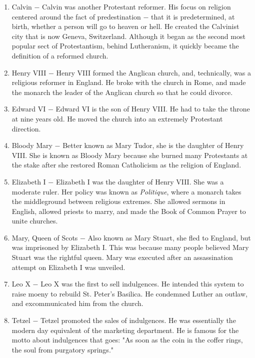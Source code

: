 \documentclass[12pt]{article}
\begin{document}
\begin{enumerate}
\item Calvin $-$ Calvin was another Protestant reformer. His focus on religion centered around the fact of predestination $-$ that it is predetermined, at birth, whether a person will go to heaven or hell. He created the Calvinist city that is now Geneva, Switzerland. Although it began as the second most popular sect of Protestantism, behind Lutheranism, it quickly became the definition of a reformed church.

\item Henry VIII $-$ Henry VIII formed the Anglican church, and, technically, was a religious reformer in England. He broke with the church in Rome, and made the monarch the leader of the Anglican church so that he could divorce.
    
\item Edward VI $-$ Edward VI is the son of Henry VIII. He had to take the throne at nine years old. He moved the church into an extremely Protestant direction.

\item Bloody Mary $-$ Better known as Mary Tudor, she is the daughter of Henry VIII. She is known as Bloody Mary because she burned many Protestants at the stake after she restored Roman Catholicism as the religion of England.

\item Elizabeth I $-$ Elizabeth I was the daughter of Henry VIII. She was a moderate ruler. Her policy was known as \textit{Politique}, where a monarch takes the middleground between religious extremes. She allowed sermons in English, allowed priests to marry, and made the Book of Common Prayer to unite churches.

\item Mary, Queen of Scots $-$ Also known as Mary Stuart, she fled to England, but was imprisoned by Elizabeth I. This was because many people believed Mary Stuart was the rightful queen. Mary was executed after an assassination attempt on Elizabeth I was unveiled.

\item Leo X $-$ Leo X was the first to sell indulgences. He intended this system to raise moeny to rebuild St. Peter's Basilica. He condemned Luther an outlaw, and excommunicated him from the church.

\item Tetzel $-$ Tetzel promoted the sales of indulgences. He was essentially the modern day equivalent of the marketing department. He is famous for the motto about indulgences that goes: "As soon as the coin in the coffer rings, the soul from purgatory springs."


\end{enumerate}
\end{document}
